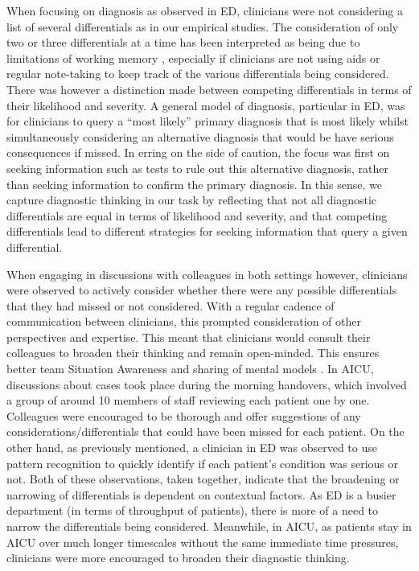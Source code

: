 \documentclass[a4paper, nobind]{templates/ociamthesis}
\begin{document}
\hfill\break
When focusing on diagnosis as observed in ED, clinicians were not considering a list of several differentials as in our empirical studies. The consideration of only two or three differentials at a time has been interpreted as being due to limitations of working memory \autocite{gilhooly_cognitive_1990}, especially if clinicians are not using aids or regular note-taking to keep track of the various differentials being considered. There was however a distinction made between competing differentials in terms of their likelihood and severity. A general model of diagnosis, particular in ED, was for clinicians to query a ``most likely'' primary diagnosis that is most likely whilst simultaneously considering an alternative diagnosis that would be have serious consequences if missed. In erring on the side of caution, the focus was first on seeking information such as tests to rule out this alternative diagnosis, rather than seeking information to confirm the primary diagnosis. In this sense, we capture diagnostic thinking in our task by reflecting that not all diagnostic differentials are equal in terms of likelihood and severity, and that competing differentials lead to different strategies for seeking information that query a given differential.

\hfill\break
When engaging in discussions with colleagues in both settings however, clinicians were observed to actively consider whether there were any possible differentials that they had missed or not considered. With a regular cadence of communication between clinicians, this prompted consideration of other perspectives and expertise. This meant that clinicians would consult their colleagues to broaden their thinking and remain open-minded. This ensures better team Situation Awareness \autocite{salas_situation_1995} and sharing of mental models \autocite{alby_diagnostic_2015}. In AICU, discussions about cases took place during the morning handovers, which involved a group of around 10 members of staff reviewing each patient one by one. Colleagues were encouraged to be thorough and offer suggestions of any considerations/differentials that could have been missed for each patient. On the other hand, as previously mentioned, a clinician in ED was observed to use pattern recognition to quickly identify if each patient's condition was serious or not. Both of these observations, taken together, indicate that the broadening or narrowing of differentials is dependent on contextual factors. As ED is a busier department (in terms of throughput of patients), there is more of a need to narrow the differentials being considered. Meanwhile, in AICU, as patients stay in AICU over much longer timescales without the same immediate time pressures, clinicians were more encouraged to broaden their diagnostic thinking.
\end{document}

